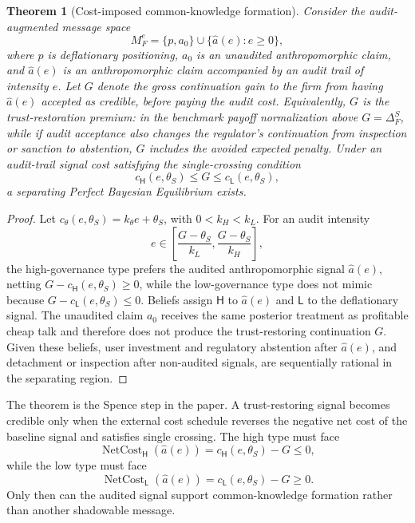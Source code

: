 \documentclass[preprint,authoryear]{elsarticle}
\newtheorem{theorem}{Theorem}
\theoremstyle{definition}
\theoremstyle{plain}
\begin{document}
\begin{theorem}[Cost-imposed common-knowledge formation]
\label{thm:audit-cost-separation}
\label{thm:separation}
Consider the audit-augmented message space
\[
M_F^e=\{p,a_0\}\cup\{\widehat a(e):e\geq0\},
\]
where $p$ is deflationary positioning, $a_0$ is an unaudited anthropomorphic
claim, and $\widehat a(e)$ is an anthropomorphic claim accompanied by an audit
trail of intensity $e$.  Let $G$ denote the gross continuation gain to the firm
from having $\widehat a(e)$ accepted as credible, before paying the audit cost.
Equivalently, $G$ is the trust-restoration premium: in the benchmark payoff
normalization above $G=\Delta_F^S$, while if audit acceptance also changes the
regulator's continuation from inspection or sanction to abstention, $G$ includes
the avoided expected penalty.  Under an audit-trail signal cost satisfying the
single-crossing condition
\[
c_\mathsf{H}(e,\theta_S)\leq G\leq c_\mathsf{L}(e,\theta_S),
\]
a separating Perfect Bayesian Equilibrium exists.
\end{theorem}
\begin{proof}
Let $c_\theta(e,\theta_S)=k_\theta e+\theta_S$, with $0<k_H<k_L$.  For an audit intensity
\[
e\in\left[\frac{G-\theta_S}{k_L},\frac{G-\theta_S}{k_H}\right],
\]
the high-governance type prefers the audited anthropomorphic signal
$\widehat a(e)$, netting $G-c_\mathsf{H}(e,\theta_S)\geq0$, while the
low-governance type does not mimic because
$G-c_\mathsf{L}(e,\theta_S)\leq0$.  Beliefs assign $\mathsf{H}$ to
$\widehat a(e)$ and $\mathsf{L}$ to the deflationary signal.  The unaudited
claim $a_0$ receives the same posterior treatment as profitable cheap talk and therefore
does not produce the trust-restoring continuation $G$.  Given these beliefs,
user investment and regulatory abstention after $\widehat a(e)$, and detachment
or inspection after non-audited signals, are sequentially rational in the
separating region.
\end{proof}

The theorem is the Spence step in the paper.  A trust-restoring signal becomes credible only when the external cost schedule reverses the negative net cost of the baseline signal and satisfies single crossing.  The high type must face
\[
\operatorname{NetCost}_{\mathsf{H}}(\widehat a(e))
=
c_\mathsf{H}(e,\theta_S)-G
\leq0,
\]
while the low type must face
\[
\operatorname{NetCost}_{\mathsf{L}}(\widehat a(e))
=
c_\mathsf{L}(e,\theta_S)-G
\geq0.
\]
Only then can the audited signal support common-knowledge formation rather than another shadowable message.
\end{document}
